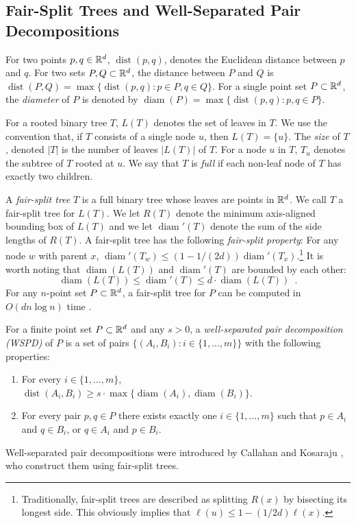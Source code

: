 \documentclass{patmorin}
\DeclareMathOperator{\diam}{diam}
\DeclareMathOperator{\dist}{dist}
\begin{document}
\subsection{Fair-Split Trees and Well-Separated Pair Decompositions}

For two points $p,q\in\mathbb{R}^d$, $\dist(p,q)$, denotes the Euclidean distance
between $p$ and $q$. For two sets $P,Q\subset\mathbb{R}^d$, the distance between
$P$ and $Q$ is $\dist(P,Q)=\max\{\dist(p,q):p\in P, q\in Q\}$.  For a
single point set $P\subset\mathbb{R}^d$, the \emph{diameter} of $P$ is denoted
by $\diam(P)=\max\{\dist(p,q):p,q\in P\}$.

For a rooted binary tree $T$, $L(T)$ denotes the set of leaves in
$T$. We use the convention that, if $T$ consists of a single node $u$,
then $L(T)=\{u\}$. The \emph{size} of $T$, denoted $|T|$ is the number of
leaves $|L(T)|$ of $T$. For a node $u$ in $T$, $T_u$ denotes the subtree
of $T$ rooted at $u$.  We say that $T$ is \emph{full} if each non-leaf
node of $T$ has exactly two children.

A \emph{fair-split tree} $T$ is a full binary tree whose
leaves are points in $\mathbb{R}^d$.  We call $T$ a fair-split tree for $L(T)$.
We let $R(T)$ denote the minimum
axis-aligned bounding box of $L(T)$ and we let $\diam'(T)$ denote the
sum of the side lengths of $R(T)$.  A fair-split tree has the following
\emph{fair-split property}: For any node $w$ with parent $x$, $\diam'(T_w)
\le (1-1/(2d))\diam'(T_x)$.\footnote{Traditionally, fair-split trees
are described as splitting $R(x)$ by bisecting its longest side.
This obviously implies that $\ell(u)\le 1-(1/2d)\ell(x)$.} It is worth
noting that $\diam(L(T))$ and $\diam'(T)$ are bounded by each other:
\[
	\diam(L(T)) \le \diam'(T) \le d\cdot\diam(L(T)) \enspace .
\]	
For any $n$-point set $P\subset\mathbb{R}^d$, a fair-split tree for $P$ can be
computed in $O(dn\log n)$ time \cite{callahan.kosaraju:decomposition}.

For a finite point set $P\subset\mathbb{R}^d$ and any $s>0$, a
\emph{well-separated pair decomposition (WSPD)} of $P$ is a set of pairs
$\{(A_i,B_i):i\in\{1,\ldots,m\}\}$ with the following properties:
\begin{enumerate}
  \item For every $i\in\{1,\ldots,m\}$, 
    $\dist(A_i,B_i)\ge s\cdot\max\{\diam(A_i),\diam(B_i)\}$.
  \item For every pair $p,q\in P$ there exists exactly one
    $i\in\{1,\ldots,m\}$ such that $p\in A_i$ and $q\in B_i$, or $q\in A_i$
    and $p\in B_i$.
\end{enumerate}
Well-separated pair decompositions were introduced by Callahan and
Kosaraju \cite{callahan.kosaraju:decomposition}, who construct them
using fair-split trees.
\end{document}
